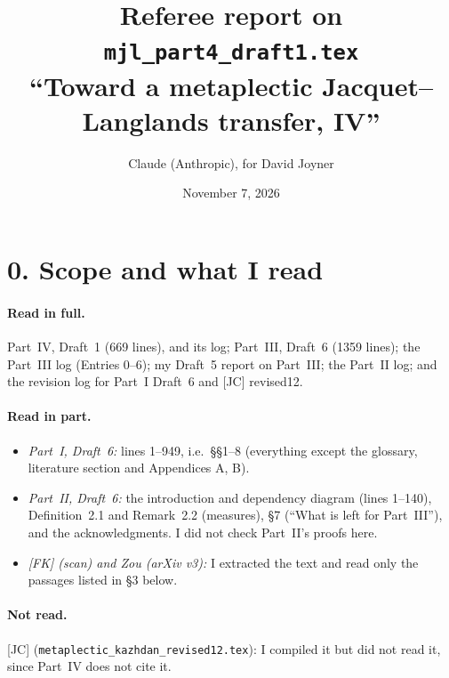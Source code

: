 \documentclass[11pt]{article}
\title{Referee report on \texttt{mjl\_part4\_draft1.tex}\\
\normalsize ``Toward a metaplectic Jacquet--Langlands transfer, IV''}
\author{Claude (Anthropic), for David Joyner}
\date{November 7, 2026}
\theoremstyle{definition}
\begin{document}
\maketitle

\section*{0. Scope and what I read}
\paragraph{Read in full.} Part~IV, Draft~1 (669 lines), and its log;
Part~III, Draft~6 (1359 lines); the Part~III log (Entries 0--6); my
Draft~5 report on Part~III; the Part~II log; and the revision log for
Part~I Draft~6 and [JC] revised12.

\paragraph{Read in part.}
\begin{itemize}
\item \emph{Part~I, Draft~6:} lines 1--949, i.e.\ \S\S1--8 (everything
except the glossary, literature section and Appendices A, B).
\item \emph{Part~II, Draft~6:} the introduction and dependency diagram
(lines 1--140), Definition~2.1 and Remark~2.2 (measures), \S7 (``What is
left for Part~III''), and the acknowledgments. I did not check
Part~II's proofs here.
\item \emph{[FK] (scan) and Zou (arXiv v3):} I extracted the text and read
only the passages listed in \S3 below.
\end{itemize}

\paragraph{Not read.} [JC] (\texttt{metaplectic\_kazhdan\_revised12.tex}):
I compiled it but did not read it, since Part~IV does not cite it.
\end{document}

